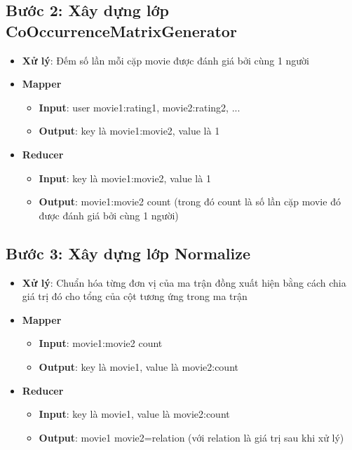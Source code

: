 \documentclass{report}
\begin{document}
\subsection*{Bước 2: Xây dựng lớp CoOccurrenceMatrixGenerator}
\begin{itemize}
    \item \textbf{Xử lý}: Đếm số lần mỗi cặp movie được đánh giá bởi cùng 1 người \\
    \item \textbf{Mapper}
          \begin{itemize}
              \item \textbf{Input}: user \quad movie1:rating1, movie2:rating2, ... \\
              \item \textbf{Output}: key là movie1:movie2, value là 1 \\
          \end{itemize}
    \item \textbf{Reducer}
          \begin{itemize}
              \item \textbf{Input}: key là movie1:movie2, value là 1 \\
              \item \textbf{Output}: movie1:movie2 \quad count (trong đó
                    count là số lần cặp movie đó được đánh giá bởi cùng 1 người) \\
          \end{itemize}
\end{itemize}
\subsection*{Bước 3: Xây dựng lớp Normalize}
\begin{itemize}
    \item \textbf{Xử lý}: Chuẩn hóa từng đơn vị của ma trận đồng xuất hiện
          bằng cách chia giá trị đó cho tổng của cột tương ứng trong ma trận
    \item \textbf{Mapper}
          \begin{itemize}
              \item \textbf{Input}: movie1:movie2 \quad count \\
              \item \textbf{Output}: key là movie1, value là movie2:count \\
          \end{itemize}
    \item \textbf{Reducer}
          \begin{itemize}
              \item \textbf{Input}: key là movie1, value là movie2:count \\
              \item \textbf{Output}: movie1 \quad movie2=relation (với relation
                    là giá trị sau khi xử lý) \\
          \end{itemize}
\end{itemize}
\end{document}
